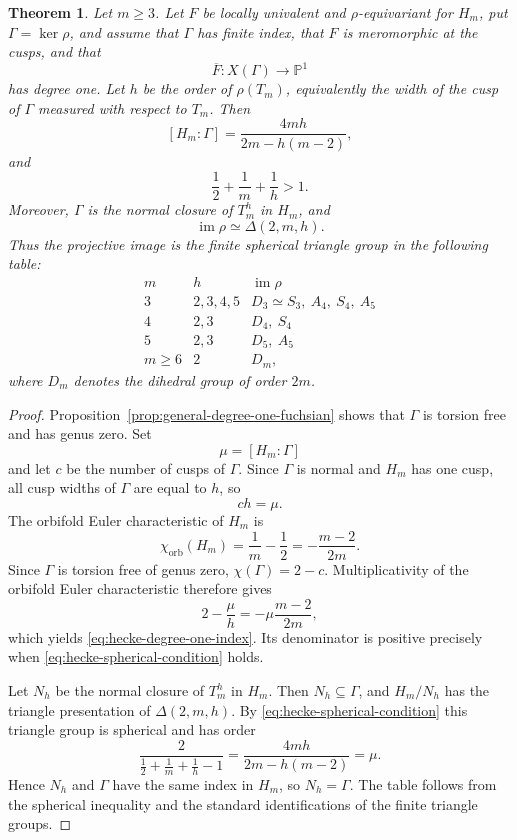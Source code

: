 \documentclass[11pt]{amsart}
\newtheorem{thm}{Theorem}[section]
\theoremstyle{definition}
\theoremstyle{remark}
\numberwithin{equation}{section}
\begin{document}
\begin{thm}\label{thm:hecke-degree-one-classification}
Let $m\geq3$. Let $F$ be locally univalent and $\rho$-equivariant for $H_m$, put $\Gamma=\ker\rho$, and assume that $\Gamma$ has finite index, that $F$ is meromorphic at the cusps, and that
\[
\overline F:X(\Gamma)\longrightarrow\mathbb P^1
\]
has degree one. Let $h$ be the order of $\rho(T_m)$, equivalently the width of the cusp of $\Gamma$ measured with respect to $T_m$. Then
\begin{equation}\label{eq:hecke-degree-one-index}
[H_m:\Gamma]
=
\frac{4mh}{2m-h(m-2)},
\end{equation}
and
\begin{equation}\label{eq:hecke-spherical-condition}
\frac12+\frac1m+\frac1h>1.
\end{equation}
Moreover, $\Gamma$ is the normal closure of $T_m^h$ in $H_m$, and
\[
\operatorname{im}\rho\simeq\Delta(2,m,h).
\]
Thus the projective image is the finite spherical triangle group in the following table:
\[
\begin{array}{c|c|c}
 m & h & \operatorname{im}\rho\\ \hline
 3 & 2,3,4,5 & D_3\simeq S_3,\ A_4,\ S_4,\ A_5\\
 4 & 2,3 & D_4,\ S_4\\
 5 & 2,3 & D_5,\ A_5\\
 m\geq6 & 2 & D_m,
\end{array}
\]
where $D_m$ denotes the dihedral group of order $2m$.
\end{thm}

\begin{proof}
Proposition~\ref{prop:general-degree-one-fuchsian} shows that $\Gamma$ is torsion free and has genus zero. Set
\[
\mu=[H_m:\Gamma]
\]
and let $c$ be the number of cusps of $\Gamma$. Since $\Gamma$ is normal and $H_m$ has one cusp, all cusp widths of $\Gamma$ are equal to $h$, so
\[
ch=\mu.
\]
The orbifold Euler characteristic of $H_m$ is
\[
\chi_{\mathrm{orb}}(H_m)
=
\frac1m-\frac12
=-\frac{m-2}{2m}.
\]
Since $\Gamma$ is torsion free of genus zero, $\chi(\Gamma)=2-c$. Multiplicativity of the orbifold Euler characteristic therefore gives
\[
2-\frac{\mu}{h}
=
-\mu\frac{m-2}{2m},
\]
which yields \eqref{eq:hecke-degree-one-index}. Its denominator is positive precisely when \eqref{eq:hecke-spherical-condition} holds.

Let $N_h$ be the normal closure of $T_m^h$ in $H_m$. Then $N_h\subseteq\Gamma$, and $H_m/N_h$ has the triangle presentation of $\Delta(2,m,h)$. By \eqref{eq:hecke-spherical-condition} this triangle group is spherical and has order
\[
\frac{2}{\frac12+\frac1m+\frac1h-1}
=
\frac{4mh}{2m-h(m-2)}
=\mu.
\]
Hence $N_h$ and $\Gamma$ have the same index in $H_m$, so $N_h=\Gamma$. The table follows from the spherical inequality and the standard identifications of the finite triangle groups.
\end{proof}
\end{document}
